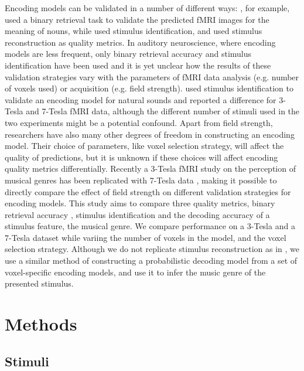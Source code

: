 Encoding models can be validated in a number of different ways: \citet{ML08},
for example, used a binary retrieval task to validate the predicted f{MRI}
images for the meaning of nouns, while \citet{KG+08} used stimulus
identification, and \citet{NG09} used stimulus reconstruction
as quality metrics.  In auditory neuroscience, where encoding models are less
frequent, only binary retrieval accuracy \citep{CTK+2012} and stimulus
identification \citep{SF14} have been used and it is yet unclear how the
results of these validation strategies vary with the parameters of f{MRI} data
analysis (e.g. number of voxels used)  or acquisition (e.g. field strength).
\citet{SF14} used stimulus identification to validate an encoding model for
natural sounds and reported a difference for 3-Tesla and 7-Tesla f{MRI} data,
although the different number of stimuli used in the two experiments might be a
potential confound.  Apart from field strength, researchers have also many
other degrees of freedom in constructing an encoding model.  Their choice of
parameters, like voxel selection strategy, will affect the quality of
predictions, but it is unknown if these choices will affect encoding quality
metrics differentially.  Recently a 3-Tesla f{MRI} study on the perception of
musical genres \citep{CTK+2012} has been replicated with 7-Tesla data
\citep{HDH+2015}, making it possible to directly compare the effect of field
strength on different validation strategies for encoding models.  This study
aims to compare three quality metrics, binary retrieval accuracy \citep{ML08},
stimulus identification \citep{KG+08,SF14} and the decoding accuracy of a stimulus
feature, the musical genre. We compare
performance on a 3-Tesla and a 7-Tesla dataset while variing the number of
voxels in the model, and the voxel selection strategy.  Although we do
not replicate stimulus reconstruction as in \citep{NG09}, we use a similar
method of constructing a probabilistic decoding model from a set of
voxel-specific encoding models, and use it to infer the music genre of the
presented stimulus.


\section*{Methods}

\subsection*{Stimuli}


